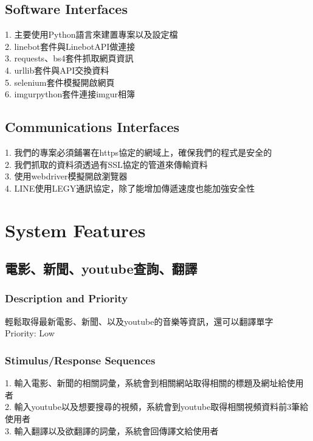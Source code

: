 \documentclass{scrreprt}
\begin{document}
\begin{CJK}{UTF8}{bkai}
\section{Software Interfaces}
1.  主要使用Python語言來建置專案以及設定檔\\
2.  linebot套件與LinebotAPI做連接\\
3.  requests、bs4套件抓取網頁資訊\\
4.  urllib套件與API交換資料\\
5.  selenium套件模擬開啟網頁\\
6.  imgurpython套件連接imgur相簿\\

\section{Communications Interfaces}
1.  我們的專案必須鋪署在https協定的網域上，確保我們的程式是安全的\\
2.  我們抓取的資料須透過有SSL協定的管道來傳輸資料\\
3.  使用webdriver模擬開啟瀏覽器\\
4.  LINE使用LEGY通訊協定，除了能增加傳遞速度也能加強安全性\\


\chapter{System Features}

\section{電影、新聞、youtube查詢、翻譯}

\subsection{Description and Priority}
輕鬆取得最新電影、新聞、以及youtube的音樂等資訊，還可以翻譯單字\\
Priority: Low

\subsection{Stimulus/Response Sequences}
1.  輸入電影、新聞的相關詞彙，系統會到相關網站取得相關的標題及網址給使用者\\
2.  輸入youtube以及想要搜尋的視頻，系統會到youtube取得相關視頻資料前3筆給使用者\\
3.  輸入翻譯以及欲翻譯的詞彙，系統會回傳譯文給使用者\\


\end{CJK}
\end{document}
